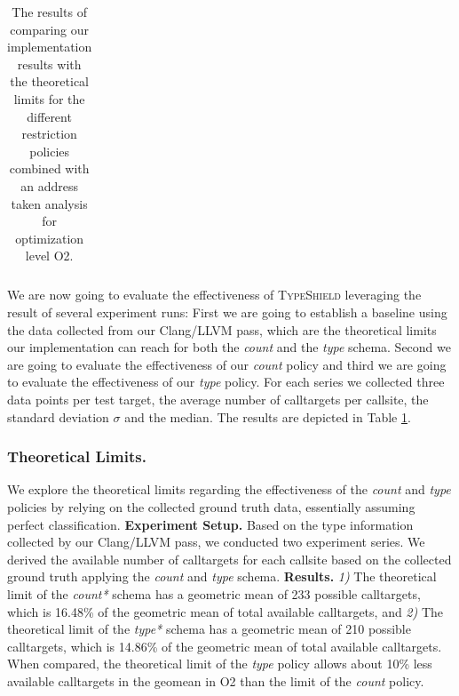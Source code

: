 \begin{table}[htbp!]
\begin{center}
{\begin{tabular}{l|r|rcl|r|rcl|r|rcl|r|rcl|r}
    	\end{tabular}

}
	\caption {The results of comparing our implementation results with the theoretical limits for the different restriction policies combined with an address taken analysis 
	for optimization level O2. 
        }
	\label{tbl:policycompat}
\end{center}
\end{table}

We are now going to evaluate the effectiveness of \textsc{TypeShield} leveraging the result of several experiment runs: First we are going to establish a baseline using the data 
collected from our Clang/LLVM pass, which are the theoretical limits our implementation can reach for both the \textit{count} and the \textit{type} schema. Second we are going to evaluate the effectiveness of our \textit{count} 
policy and third we are going to evaluate the effectiveness of our \textit{type} policy. For each series we collected three data points per test target, the average number of calltargets per callsite, the standard deviation $\sigma$ and the median. 
The results are depicted in Table \ref{tbl:policycompat}. 

\subsubsection{Theoretical Limits.}
\label{subsection:theoreticallimit}
We explore the theoretical limits regarding the effectiveness of the \textit{count} and \textit{type} policies by relying on the collected ground truth data, essentially assuming perfect classification.
\textbf{Experiment Setup.} Based on the type information collected by our Clang/LLVM pass, we conducted two experiment series.
We derived the available number of calltargets for each callsite based on the collected ground truth applying the \textit{count} and \textit{type} schema.
\textbf{Results.}
\textit{1)} The theoretical limit of the \textit{count*} schema has a geometric mean of 233 possible calltargets, which is 16.48\% of the geometric mean of total available 
calltargets, and
\textit{2)} The theoretical limit of the \textit{type*} schema has a geometric mean of 210 possible calltargets, which is 14.86\% of the geometric mean of total available
calltargets.
When compared, the theoretical limit of the \textit{type} policy allows about 10\% less available calltargets in the geomean in O2 than the limit of the \textit{count} policy.


